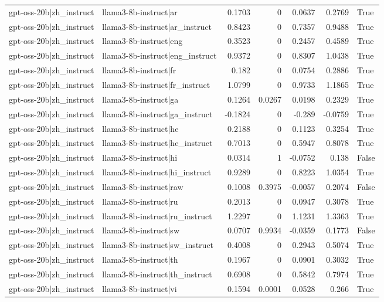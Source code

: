 \begin{table}
\begin{tabular}{l l r r r r l}
gpt-oss-20b|zh_instruct & llama3-8b-instruct|ar & 0.1703 & 0 & 0.0637 & 0.2769 & True \\
gpt-oss-20b|zh_instruct & llama3-8b-instruct|ar_instruct & 0.8423 & 0 & 0.7357 & 0.9488 & True \\
gpt-oss-20b|zh_instruct & llama3-8b-instruct|eng & 0.3523 & 0 & 0.2457 & 0.4589 & True \\
gpt-oss-20b|zh_instruct & llama3-8b-instruct|eng_instruct & 0.9372 & 0 & 0.8307 & 1.0438 & True \\
gpt-oss-20b|zh_instruct & llama3-8b-instruct|fr & 0.182 & 0 & 0.0754 & 0.2886 & True \\
gpt-oss-20b|zh_instruct & llama3-8b-instruct|fr_instruct & 1.0799 & 0 & 0.9733 & 1.1865 & True \\
gpt-oss-20b|zh_instruct & llama3-8b-instruct|ga & 0.1264 & 0.0267 & 0.0198 & 0.2329 & True \\
gpt-oss-20b|zh_instruct & llama3-8b-instruct|ga_instruct & -0.1824 & 0 & -0.289 & -0.0759 & True \\
gpt-oss-20b|zh_instruct & llama3-8b-instruct|he & 0.2188 & 0 & 0.1123 & 0.3254 & True \\
gpt-oss-20b|zh_instruct & llama3-8b-instruct|he_instruct & 0.7013 & 0 & 0.5947 & 0.8078 & True \\
gpt-oss-20b|zh_instruct & llama3-8b-instruct|hi & 0.0314 & 1 & -0.0752 & 0.138 & False \\
gpt-oss-20b|zh_instruct & llama3-8b-instruct|hi_instruct & 0.9289 & 0 & 0.8223 & 1.0354 & True \\
gpt-oss-20b|zh_instruct & llama3-8b-instruct|raw & 0.1008 & 0.3975 & -0.0057 & 0.2074 & False \\
gpt-oss-20b|zh_instruct & llama3-8b-instruct|ru & 0.2013 & 0 & 0.0947 & 0.3078 & True \\
gpt-oss-20b|zh_instruct & llama3-8b-instruct|ru_instruct & 1.2297 & 0 & 1.1231 & 1.3363 & True \\
gpt-oss-20b|zh_instruct & llama3-8b-instruct|sw & 0.0707 & 0.9934 & -0.0359 & 0.1773 & False \\
gpt-oss-20b|zh_instruct & llama3-8b-instruct|sw_instruct & 0.4008 & 0 & 0.2943 & 0.5074 & True \\
gpt-oss-20b|zh_instruct & llama3-8b-instruct|th & 0.1967 & 0 & 0.0901 & 0.3032 & True \\
gpt-oss-20b|zh_instruct & llama3-8b-instruct|th_instruct & 0.6908 & 0 & 0.5842 & 0.7974 & True \\
gpt-oss-20b|zh_instruct & llama3-8b-instruct|vi & 0.1594 & 0.0001 & 0.0528 & 0.266 & True \\

\end{tabular}
\end{table}
